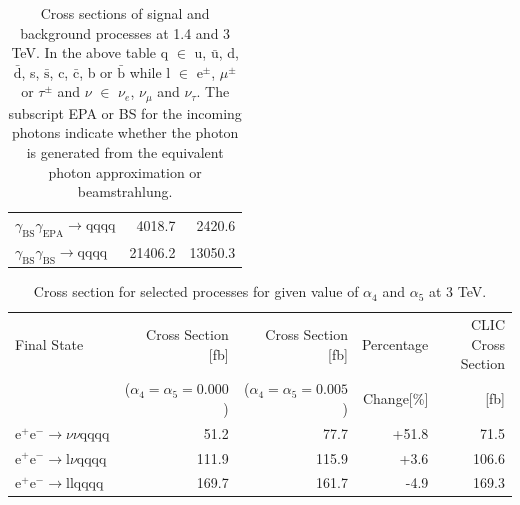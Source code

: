 \begin{table}[h!]
\begin{tabular}{ l r r }
$\gamma_{\text{BS}}\gamma_{\text{EPA}} \rightarrow \text{qqqq}$ & 4018.7 & 2420.6 \\
$\gamma_{\text{BS}}\gamma_{\text{BS}} \rightarrow \text{qqqq}$ & 21406.2 & 13050.3 \\
\hline
\end{tabular}
\caption[]{Cross sections of signal and background processes at 1.4 and 3 TeV. In the above table q $\in$ u, $\bar{\text{u}}$, d, $\bar{\text{d}}$, s, $\bar{\text{s}}$, c, $\bar{\text{c}}$, b or $\bar{\text{b}}$ while l $\in$ $\text{e}^{\pm}$, $\mu^{\pm}$ or $\tau^{\pm}$ and $\nu$ $\in$ $\nu_{e}$, $\nu_{\mu}$ and $\nu_{\tau}$.  The subscript EPA or BS for the incoming photons indicate whether the photon is generated from the equivalent photon approximation or beamstrahlung.}
\label{table:crosssectionfull}
\end{table}

\begin{table}
\centering
\begin{tabular}{ l r r r r }
\hline
Final State & Cross Section [fb] & Cross Section [fb] & Percentage & CLIC Cross Section \\ 
& ($\alpha_{4} = \alpha_{5} = 0.000$) & ($\alpha_{4} = \alpha_{5} = 0.005$) & Change[\%] & [fb] \\ 
\hline
$\text{e}^{+}\text{e}^{-} \rightarrow \nu{\nu}\text{qqqq}$ & 51.2 & 77.7 & +51.8 & 71.5 \\
$\text{e}^{+}\text{e}^{-} \rightarrow \text{l}{\nu}\text{qqqq}$ & 111.9 & 115.9 & +3.6 & 106.6 \\
$\text{e}^{+}\text{e}^{-} \rightarrow \text{llqqqq}$ & 169.7 & 161.7 & -4.9 & 169.3 \\
\hline
\end{tabular}
\caption{Cross section for selected processes for given value of $\alpha_{4}$ and $\alpha_{5}$ at 3 TeV.}
\label{table:crosssectionsensitivity3000}
\end{table}

